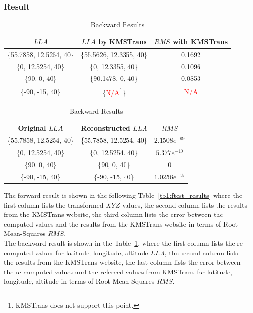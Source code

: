 \subsubsection{Result}
\begin{table}[h]
	\centering
	\caption{Backward Results}
	\label{tb2:btest_results}
	\begin{tabular}{c|c|c}
		\hline
		\textbf{$LLA$} & \textbf{$LLA$} by KMSTrans & \textbf{$RMS$} with KMSTrans \\ \hline
		\{55.7858, 12.5254, 40\}  & \{55.5626, 12.3355, 40\}   &  0.1692  \\ \hline
		\{0, 12.5254, 40\}  & \{0, 12.3355, 40\}   &  0.1096  \\ \hline
		\{90, 0, 40\}  & \{90.1478, 0, 40\}   &  0.0853  \\ \hline
		\{-90, -15, 40\}  & \{\textcolor{red}{N/A}\footnote{KMSTrans does not support this point.}\}   &  \textcolor{red}{N/A}  \\ \hline
	\end{tabular}
\end{table}
\begin{table}[h]
	\centering
	\caption{Backward Results}
	\label{tb3:fbtest}
	\begin{tabular}{c|c|c}
		\hline
		\textbf{Original $LLA$} & \textbf{Reconstructed $LLA$} & \textbf{$RMS$} \\ \hline
		\{55.7858, 12.5254, 40\}  & \{55.7858, 12.5254, 40\}   &  $2.1508e^{-09}$  \\ \hline
		\{0, 12.5254, 40\}  & \{0, 12.5254, 40\}   &  $5.377e^{-10}$  \\ \hline
		\{90, 0, 40\}  & \{90, 0, 40\}   &  0  \\ \hline
		\{-90, -15, 40\}  & \{-90, -15, 40\} &  $1.0256e^{-15}$ \\ \hline
	\end{tabular}
\end{table}
The forward result is shown in the following Table~\ref{tb1:ftest_results} where the first column lists the transformed $XYZ$ values, the second column lists the results from the KMSTrans website, the third column lists the error between the computed values and the results from the KMSTrans website in terms of Root-Mean-Squares $RMS$. \\
The backward result is shown in the Table~\ref{tb2:btest_results}, where the first column lists the re-computed values for latitude, longitude, altitude $LLA$, the second column lists the results from the KMSTrans website, the last column lists the error between the re-computed values and the refereed values from KMSTrans for latitude, longitude, altitude in terms of Root-Mean-Squares $RMS$.
